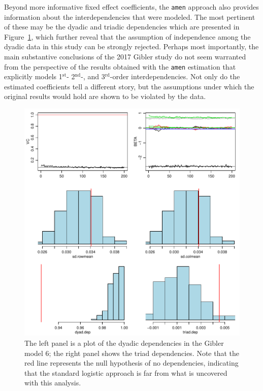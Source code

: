\documentclass[12pt]{amsart}
\newcommand{\first}{1$^{\text{st}}$}
\newcommand{\second}{2$^{\text{nd}}$}
\newcommand{\third}{3$^{\text{rd}}$}
\begin{document}
Beyond more informative fixed effect coefficients, the \texttt{amen} approach also provides information about the interdependencies that were modeled. The most pertinent of these may be the dyadic and triadic dependencies which are presented in Figure~\ref{fig:gibler:dyadtriad}, which further reveal that the assumption of independence among the dyadic data in this study can be strongly rejected. Perhaps most importantly, the main substantive conclusions of the 2017 Gibler study do not seem warranted from the perspective of the results obtained with the \texttt{amen} estimation that explicitly models \first- \second-, and \third-order interdependencies. Not only do the estimated coefficients tell a different story, but the assumptions under which the original results would hold are shown to be violated by the data.


\begin{figure}
\caption{\label{fig:gibler:dyadtriad} The left panel is  a plot of the dyadic dependencies in the Gibler model 6; the right panel shows the triad dependencies.  Note that the red line represents the null hypothesis of no dependencies, indicating that the standard logistic approach is far from what is uncovered with this analysis. }
\includegraphics[width=\textwidth]{netplots}
\end{figure}
\end{document}
